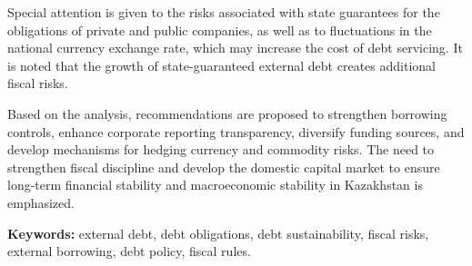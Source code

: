 Special attention is given to the risks associated with state guarantees
for the obligations of private and public companies, as well as to
fluctuations in the national currency exchange rate, which may increase
the cost of debt servicing. It is noted that the growth of
state-guaranteed external debt creates additional fiscal risks.

Based on the analysis, recommendations are proposed to strengthen
borrowing controls, enhance corporate reporting transparency, diversify
funding sources, and develop mechanisms for hedging currency and
commodity risks. The need to strengthen fiscal discipline and develop
the domestic capital market to ensure long-term financial stability and
macroeconomic stability in Kazakhstan is emphasized.

{\bfseries Keywords:} external debt, debt obligations, debt sustainability,
fiscal risks, external borrowing, debt policy, fiscal rules.

